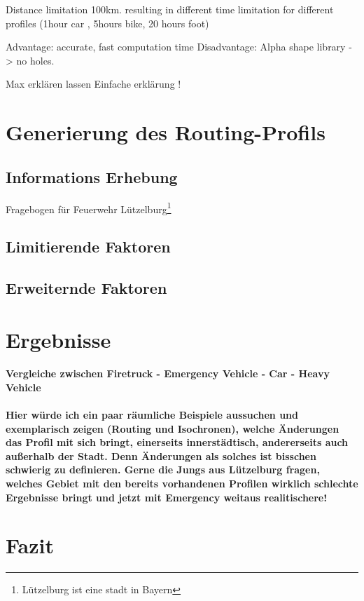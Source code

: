 \documentclass[10pt,a4paper]{article}
\begin{document}
 Distance limitation 100km. resulting in different time limitation for different profiles (1hour car , 5hours bike, 20 hours foot)

Advantage: accurate, fast computation time
Disadvantage: Alpha shape library -> no holes.




Max erklären lassen
Einfache erklärung !

\section{Generierung des Routing-Profils}

\subsection{Informations Erhebung}
Fragebogen für Feuerwehr Lützelburg\footnote{Lützelburg ist eine stadt in Bayern}

\subsection{Limitierende Faktoren}

\subsection{Erweiternde Faktoren}

\section{Ergebnisse}
\paragraph{
Vergleiche zwischen Firetruck - Emergency Vehicle - Car - Heavy Vehicle
}
\paragraph{
\color{red}
Hier würde ich ein paar räumliche Beispiele aussuchen und exemplarisch zeigen (Routing und Isochronen), welche Änderungen das Profil mit sich bringt, einerseits innerstädtisch, andererseits auch außerhalb der Stadt. Denn Änderungen als solches ist bisschen schwierig zu definieren. Gerne die Jungs aus Lützelburg fragen, welches Gebiet mit den bereits vorhandenen Profilen wirklich schlechte Ergebnisse bringt und jetzt mit Emergency weitaus realitischere!
}

\section{Fazit}
\end{document}
